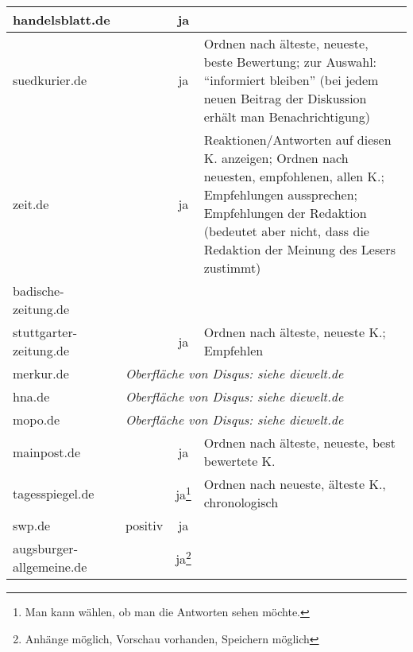 \begin{landscape}
\begin{longtable}{lccp{100mm}}
handelsblatt.de
&
& ja
&
\\\midrule

suedkurier.de
&
& ja
& Ordnen nach älteste, neueste, beste Bewertung; zur Auswahl: ``informiert
  bleiben'' (bei jedem neuen Beitrag der Diskussion erhält man
  Benachrichtigung)
\\\midrule

zeit.de
&
& ja

& Reaktionen/Antworten auf diesen K. anzeigen; Ordnen nach neuesten,
  empfohlenen, allen K.; Empfehlungen aussprechen; Empfehlungen der Redaktion
  (bedeutet aber nicht, dass die Redaktion der Meinung des Lesers
  zustimmt)
\\\midrule

badische-zeitung.de
&
&
&
\\\midrule

stuttgarter-zeitung.de
&
& ja
& Ordnen nach älteste, neueste K.; Empfehlen
\\\midrule

merkur.de & \multicolumn{3}{l}{\hspace{2cm}\em Oberfläche von Disqus: siehe diewelt.de}
\\\midrule

hna.de & \multicolumn{3}{l}{\hspace{2cm}\em Oberfläche von Disqus: siehe diewelt.de}
\\\midrule

mopo.de & \multicolumn{3}{l}{\hspace{2cm}\em Oberfläche von Disqus: siehe diewelt.de}
\\\midrule

mainpost.de
&
& ja
& Ordnen nach älteste, neueste, best bewertete K.
\\\midrule

tagesspiegel.de
&
& ja\footnote{Man kann wählen, ob man die Antworten sehen möchte.}
& Ordnen nach neueste, älteste K., chronologisch
\\\midrule

swp.de
& positiv
& ja
&
\\\midrule

augsburger-allgemeine.de
&
& ja\footnote{Anhänge möglich, Vorschau vorhanden, Speichern möglich}
&

\end{longtable}
\end{landscape}

